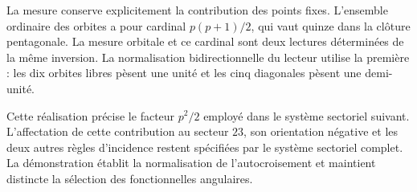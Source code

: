 La mesure conserve explicitement la contribution des points fixes.
L'ensemble ordinaire des orbites a pour cardinal $p(p+1)/2$, qui vaut
quinze dans la clôture pentagonale. La mesure orbitale et ce cardinal sont
deux lectures déterminées de la même inversion. La normalisation
bidirectionnelle du lecteur utilise la première : les dix orbites libres
pèsent une unité et les cinq diagonales pèsent une demi-unité.

Cette réalisation précise le facteur $p^2/2$ employé dans le système
sectoriel suivant. L'affectation de cette contribution au secteur $23$,
son orientation négative et les deux autres règles d'incidence restent
spécifiées par le système sectoriel complet. La démonstration établit la
normalisation de l'autocroisement et maintient distincte la sélection des
fonctionnelles angulaires.
